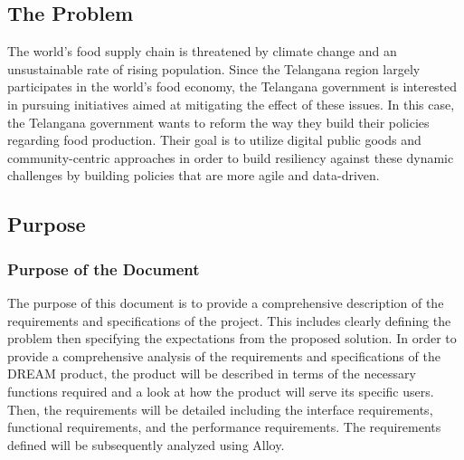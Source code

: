 \setcounter{goals_counter}{1}
\subsection{The Problem}
\begin{flushleft}
The world's food supply chain is threatened by climate change and an unsustainable rate of rising population. Since the Telangana region largely participates in the world's food economy, the Telangana government is interested in pursuing initiatives aimed at mitigating the effect of these issues. In this case, the Telangana government wants to reform the way they build their policies regarding food production. Their goal is to utilize digital public goods and community-centric approaches in order to build resiliency against these dynamic challenges by building policies that are more agile and data-driven. 


\subsection{Purpose}
\subsubsection{Purpose of the Document}
The purpose of this document is to provide a comprehensive description of the requirements and specifications of the project. This includes clearly defining the problem then specifying the expectations from the proposed solution. In order to provide a comprehensive analysis of the requirements and specifications of the DREAM product, the product will be described in terms of the necessary functions required and a look at how the product will serve its specific users. Then, the requirements will be detailed including the interface requirements, functional requirements, and the performance requirements. The requirements defined will be subsequently analyzed using Alloy. 


\end{flushleft}
